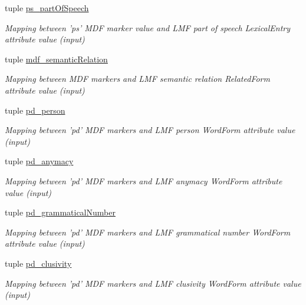 \begin{DoxyCompactItemize}
tuple \hyperlink{namespacelmf_1_1src_1_1config_1_1mdf_a1e76a452fc77f05851e4369134f5980b}{ps\+\_\+part\+Of\+Speech}
\begin{DoxyCompactList}\small\item\em Mapping between 'ps' M\+D\+F marker value and L\+M\+F part of speech Lexical\+Entry attribute value (input) \end{DoxyCompactList}\item 
tuple \hyperlink{namespacelmf_1_1src_1_1config_1_1mdf_a20455cbc7aa64cc6eb4ad1749a381738}{mdf\+\_\+semantic\+Relation}
\begin{DoxyCompactList}\small\item\em Mapping between M\+D\+F markers and L\+M\+F semantic relation Related\+Form attribute value (input) \end{DoxyCompactList}\item 
tuple \hyperlink{namespacelmf_1_1src_1_1config_1_1mdf_ab58fb9b58bc32ac36efe9b26e4ea3ca2}{pd\+\_\+person}
\begin{DoxyCompactList}\small\item\em Mapping between 'pd' M\+D\+F markers and L\+M\+F person Word\+Form attribute value (input) \end{DoxyCompactList}\item 
tuple \hyperlink{namespacelmf_1_1src_1_1config_1_1mdf_a011f241f41e3620deefe53cbb42286b9}{pd\+\_\+anymacy}
\begin{DoxyCompactList}\small\item\em Mapping between 'pd' M\+D\+F markers and L\+M\+F anymacy Word\+Form attribute value (input) \end{DoxyCompactList}\item 
tuple \hyperlink{namespacelmf_1_1src_1_1config_1_1mdf_a64be26974728c369cd72ef80bd297154}{pd\+\_\+grammatical\+Number}
\begin{DoxyCompactList}\small\item\em Mapping between 'pd' M\+D\+F markers and L\+M\+F grammatical number Word\+Form attribute value (input) \end{DoxyCompactList}\item 
tuple \hyperlink{namespacelmf_1_1src_1_1config_1_1mdf_ac57ebe92cdf841d8d1bfe1e1b94b96bb}{pd\+\_\+clusivity}
\begin{DoxyCompactList}\small\item\em Mapping between 'pd' M\+D\+F markers and L\+M\+F clusivity Word\+Form attribute value (input) \end{DoxyCompactList}\item 

\end{DoxyCompactItemize}

